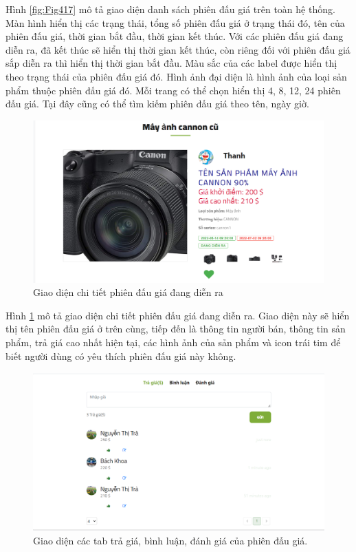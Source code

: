 \documentclass[../DoAn.tex]{subfiles}
\begin{document}
Hình \ref{fig:Fig417} mô tả giao diện danh sách phiên đấu giá trên toàn hệ thống. Màn hình hiển thị các trạng thái, tổng số phiên đấu giá ở trạng thái đó, tên của phiên đấu giá, thời gian bắt đầu, thời gian kết thúc. Với các phiên đấu giá đang diễn ra, đã kết thúc sẽ hiển thị thời gian kết thúc, còn riêng đối với phiên đấu giá sắp diễn ra thì hiển thị thời gian bắt đầu. Màu sắc của các label được hiển thị theo trạng thái của phiên đấu giá đó. Hình ảnh đại diện là hình ảnh của loại sản phẩm thuộc phiên đấu giá đó. Mỗi trang có thể chọn hiển thị 4, 8, 12, 24 phiên đấu giá. Tại đây cũng có thể tìm kiếm phiên đấu giá theo tên, ngày giờ. 
\begin{figure}[H]
    \centering
    \includegraphics[width=0.75\linewidth,height=6.24cm]{Hinhve/auctionactive.png}
    \caption{Giao diện chi tiết phiên đấu giá đang diễn ra}
    \label{fig:Fig418}
\end{figure}
Hình \ref{fig:Fig418} mô tả giao diện chi tiết phiên đấu giá đang diễn ra. Giao diện này sẽ hiển thị tên phiên đấu giá ở trên cùng, tiếp đến là thông tin người bán, thông tin sản phẩm, trả giá cao nhất hiện tại, các hình ảnh của sản phẩm và icon trái tim để biết người dùng có yêu thích phiên đấu giá này không.
\begin{figure}[H]
    \centering
    \includegraphics[width=0.75\linewidth,height=6.1cm]{Hinhve/commentbid.png}
    \caption{Giao diện các tab trả giá, bình luận, đánh giá của phiên đấu giá.}
    \label{fig:Fig419}
\end{figure}
\end{document}
